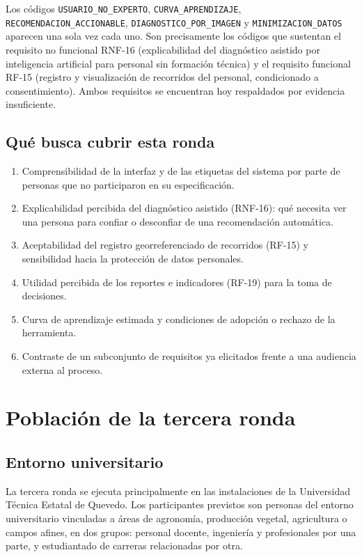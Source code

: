 \documentclass[11pt,a4paper]{article}
\begin{document}
Los códigos \texttt{USUARIO\_NO\_EXPERTO}, \texttt{CURVA\_APRENDIZAJE},
\texttt{RECOMENDACION\_ACCIONABLE}, \texttt{DIAGNOSTICO\_POR\_IMAGEN} y \texttt{MINIMIZACION\_DATOS}
aparecen una sola vez cada uno. Son precisamente los códigos que sustentan el requisito no funcional
RNF-16 (explicabilidad del diagnóstico asistido por inteligencia artificial para personal sin formación
técnica) y el requisito funcional RF-15 (registro y visualización de recorridos del personal, condicionado
a consentimiento). Ambos requisitos se encuentran hoy respaldados por evidencia insuficiente.

\subsection{Qué busca cubrir esta ronda}

\begin{enumerate}[leftmargin=*,itemsep=2pt]
  \item Comprensibilidad de la interfaz y de las etiquetas del sistema por parte de personas que no
        participaron en su especificación.
  \item Explicabilidad percibida del diagnóstico asistido (RNF-16): qué necesita ver una persona para
        confiar o desconfiar de una recomendación automática.
  \item Aceptabilidad del registro georreferenciado de recorridos (RF-15) y sensibilidad hacia la
        protección de datos personales.
  \item Utilidad percibida de los reportes e indicadores (RF-19) para la toma de decisiones.
  \item Curva de aprendizaje estimada y condiciones de adopción o rechazo de la herramienta.
  \item Contraste de un subconjunto de requisitos ya elicitados frente a una audiencia externa al proceso.
\end{enumerate}

\section{Población de la tercera ronda}

\subsection{Entorno universitario}

La tercera ronda se ejecuta principalmente en las instalaciones de la Universidad Técnica Estatal de
Quevedo. Los participantes previstos son personas del entorno universitario vinculadas a áreas de
agronomía, producción vegetal, agricultura o campos afines, en dos grupos: personal docente, ingeniería y
profesionales por una parte, y estudiantado de carreras relacionadas por otra.
\end{document}
